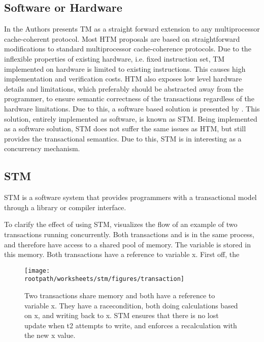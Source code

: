 \subsection{Software or Hardware}
In \cite{herlihy1993transactional} the Authors presents \ac{TM} as a straight forward extension to any multiprocessor cache-coherent protocol. Most \ac{HTM} proposals are based on straightforward modifications to standard multiprocessor cache-coherence protocols\cite{scott2011sync}. Due to the inflexible properties of existing hardware, i.e. fixed instruction set, \ac{TM} implemented on hardware is limited to existing instructions. This causes high implementation and verification costs\cite{cascaval2008software}. \ac{HTM} also exposes low level hardware details and limitations\cite{scott2011sync}, which preferably should be abstracted away from the programmer, to ensure semantic correctness of the transactions regardless of the hardware limitations. Due to this, a software based solution is presented by \cite{shavit1997software}. This solution, entirely implemented as software, is known as \acl{STM}. Being implemented as a software solution, \ac{STM} does not suffer the same issues as \ac{HTM}, but still provides the transactional semantics. Due to this, \ac{STM} is in interesting as a concurrency mechanism.

\subsection{\ac{STM}}
STM is a software system that provides programmers with a transactional model through a library or compiler interface\cite{scott2011sync}.

To clarify the effect of using \ac{STM},  visualizes the flow of an example of two transactions running concurrently. Both transactions  and  is in the same process, and therefore have access to a shared pool of memory. The variable  is stored in this memory. Both transactions have a reference to variable x. First off, the 

\begin{figure}[h!]
\centering
\texttt{[image: \\rootpath/worksheets/stm/figures/transaction]}
\caption{Two transactions share memory and both have a reference to variable x. They have a racecondition, both doing calculations based on x, and writing back to x. \ac{STM} ensures that there is no lost update when t2 attempts to write, and enforces a recalculation with the new x value.}\label{fig:transaction}
\end{figure}

